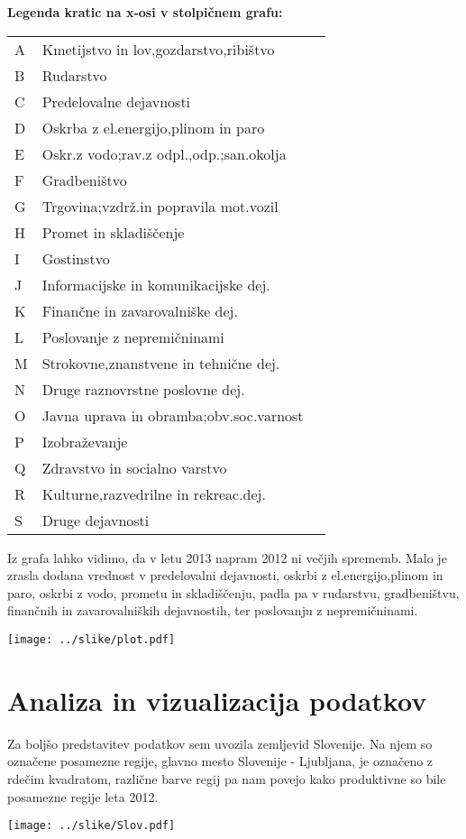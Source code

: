\documentclass[a4paper, 11pt]{article}
\begin{document}
\textbf{Legenda kratic na x-osi v stolpičnem grafu:}
\begin{table}[h]
\begin{tabular}{lll}
A  & Kmetijstvo in lov,gozdarstvo,ribištvo \\
B & Rudarstvo  \\
C & Predelovalne dejavnosti  \\
D & Oskrba z el.energijo,plinom in paro  \\
E & Oskr.z vodo;rav.z odpl.,odp.;san.okolja	\\
F & Gradbeništvo	\\
G & Trgovina;vzdrž.in popravila mot.vozil	\\
H & Promet in skladiščenje	\\
I & Gostinstvo	\\
J & Informacijske in komunikacijske dej.\\	
K & Finančne in zavarovalniške dej.	\\
L & Poslovanje z nepremičninami	\\
M & Strokovne,znanstvene in tehnične dej.	\\
N & Druge raznovrstne poslovne dej.	\\
O & Javna uprava in obramba;obv.soc.varnost \\
P & Izobraževanje	\\
Q & Zdravstvo in socialno varstvo	\\
R & Kulturne,razvedrilne in rekreac.dej.\\	
S & Druge dejavnosti
\end{tabular}
\end{table}

Iz grafa lahko vidimo, da v letu 2013 napram 2012 ni večjih sprememb. Malo je zrasla dodana vrednost v predelovalni dejavnosti, oskrbi z el.energijo,plinom in paro, oskrbi z vodo, prometu in skladiščenju, padla pa v rudarstvu, gradbeništvu, finančnih in zavarovalniških dejavnostih, ter poslovanju z nepremičninami.


\begin{center}

\texttt{[image: ../slike/plot.pdf]}
\end{center}

\section{Analiza in vizualizacija podatkov}
Za boljšo predstavitev podatkov sem uvozila zemljevid Slovenije. Na njem so označene posamezne regije, glavno mesto Slovenije - Ljubljana, je označeno z rdečim kvadratom, različne barve regij pa nam povejo kako produktivne so bile posamezne regije leta 2012.
\newpage
\begin{center}
\texttt{[image: ../slike/Slov.pdf]}
\end{center}
\end{document}
